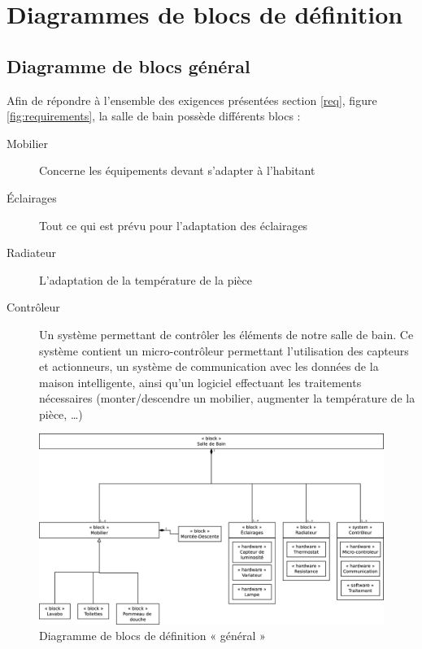 \chapter{Diagrammes de blocs de définition}
\section{Diagramme de blocs général}
Afin de répondre à l'ensemble des exigences présentées section \ref{req}, figure \ref{fig:requirements}, la salle de bain possède différents blocs : 
\begin{description}
	\item[Mobilier] Concerne les équipements devant s'adapter à l'habitant
	\item[Éclairages] Tout ce qui est prévu pour l'adaptation des éclairages
	\item[Radiateur] L'adaptation de la température de la pièce
	\item[Contrôleur] Un système permettant de contrôler les éléments de notre salle de bain. Ce système contient un micro-contrôleur permettant l'utilisation des capteurs et actionneurs, un système de communication avec les données de la maison intelligente, ainsi qu'un logiciel effectuant les traitements nécessaires (monter/descendre un mobilier, augmenter la température de la pièce, \ldots)
\end{description}
\vfill

\begin{figure}[H]
	\centering
	\includegraphics[width=1\linewidth]{diagrams/bathroom/diagramme_blocks_bdd.eps}
	\caption{Diagramme de blocs de définition « général »}
	\label{fig:diagramme_bdd}
\end{figure}
\vfill
\pagebreak
